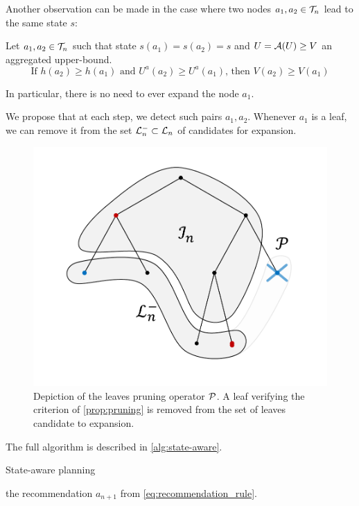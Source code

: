 \documentclass[runningheads]{llncs}
\begin{document}
Another observation can be made in the case where two nodes $a_1,a_2\in\mathcal{T}_n$ lead to the same state $s$:
\begin{proposition}
\label{prop:pruning}
Let $a_1,a_2\in\mathcal{T}_n$ such that state $s(a_1) = s(a_2) = s$ and $U = \mathcal{A}(U) \geq V$ an aggregated upper-bound. 
\begin{equation}
\label{eq:pruning}
    \text{If } h(a_2) \geq h(a_1) \text{ and } U^a(a_2) \geq U^a(a_1)
    \text{, then }V(a_2) \geq V(a_1)
\end{equation}

In particular, there is no need to ever expand the node $a_1$.
\end{proposition}

We propose that at each step, we detect such pairs $a_1, a_2$. Whenever $a_1$ is a leaf, we can remove it from the set $\mathcal{L}_n^-\subset \mathcal{L}_n $ of candidates for expansion.

\begin{figure}[H]
	\centering
	\includegraphics[trim={1.8cm 1.4cm 1.9cm 1.1cm}, clip, width=0.4\linewidth]{img/tree_4}
	\caption{Depiction of the leaves pruning operator $\mathcal{P}$. A leaf verifying the criterion of \autoref{prop:pruning} is removed from the set of leaves candidate to expansion.}
\end{figure}

The full algorithm is described in \autoref{alg:state-aware}.\\
\begin{algorithm}[H]
	\caption{State-aware planning}
	\label{alg:state-aware}
	\SetAlgoLined\DontPrintSemicolon
	\Return the recommendation $a_{n+1}$ from \eqref{eq:recommendation_rule}.\;
\end{algorithm}
\end{document}
